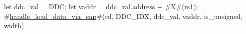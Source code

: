 let ddc_val = DDC;
let vaddr = ddc_val.address + #\hyperref[sailRISCVzX]{X}#(rs1);
#\hyperref[sailRISCVzhandlezyloadzydatazyviazycap]{handle\_load\_data\_via\_cap}#(rd, DDC_IDX, ddc_val, vaddr, is_unsigned, width)

